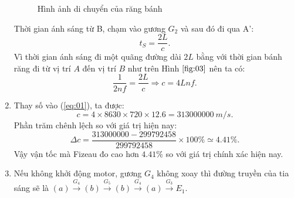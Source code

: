 \begin{enumerate}
\begin{figure}[!h]
{
    }
    
    \caption{Hình ảnh di chuyển của răng bánh}
    \label{fig:03}
\end{figure}

    Thời gian ánh sáng từ B, chạm vào gương $G_2$ và sau đó đi qua A':
    \begin{equation}
        t_S = \frac{2L}{c}.
    \end{equation}
    Vì thời gian ánh sáng đi một quãng đường dài $2L$ bằng với thời gian bánh răng đi từ vị trí $A$ đến vị trí $B$ như trên Hình $\ref{fig:03}$ nên ta có:
    \begin{equation}
        \frac{1}{2nf} = \frac{2L}{c} \Rightarrow c = 4Lnf.
        \label{eq:01}
    \end{equation}

    \item 
    Thay số vào (\ref{eq:01}), ta được:
    \begin{equation}
        c = 4 \times 8630 \times 720 \times 12.6 = \SI{313 000 000}{m/s}.
    \end{equation}
    Phần trăm chênh lệch so với giá trị hiện nay:
    \begin{equation}
        \Delta c = \frac{313 000 000 - 299 792 458}{299 792 458} \times 100 \% \simeq 4.41 \%.
    \end{equation}
    Vậy vận tốc mà Fizeau đo cao hơn $4.41\%$ so với giá trị chính xác hiện nay.
    
    \item 
    Nếu không khởi động motor, gương $G_4$ không xoay thì đường truyền của tia sáng sẽ là $(a) \xrightarrow{G_4} (b) \xrightarrow{G_5} (b) \xrightarrow{G_4} (a) \xrightarrow{G_3} E_1$. \\
    

\end{enumerate}
